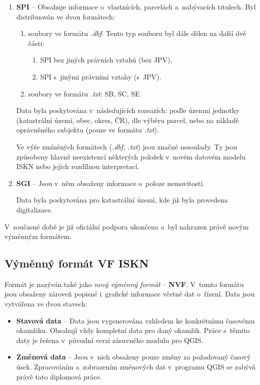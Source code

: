 \documentclass[a4paper,12pt,oneside]{book}
\begin{document}
\begin{enumerate}
 \item \textbf{SPI} -- Obsahuje informace o~vlastnících, parcelách a~nabývacích titulech. Byl distribuován ve dvou formátech:
 \begin{enumerate}
  \item soubory ve formátu \textit{.dbf}: Tento typ souboru byl dále dělen na další dvě části:
  
  \begin{enumerate}
   \item SPI bez jiných právních vztahů (bez JPV),
   \item SPI s~jinými právními vztahy (s~JPV).
  \end{enumerate}
  
  \item soubory ve formátu \textit{.txt}: SB, SC, SE
 \end{enumerate}
 
 Data byla poskytována v~následujících rozsazích: podle územní jednotky (katastrální území, obec, okres, ČR), dle výběru parcel, nebo na základě oprávněného subjektu (pouze ve formátu \textit{.txt}).
 
 Ve výše zmíněných formátech (\textit{.dbf, .txt}) jsou značné nesoulady. Ty jsou způsobeny hlavně neexistencí některých položek v~novém datovém modelu ISKN nebo jejich rozdílnou interpretací.

 \item \textbf{SGI} -- Jsou v~něm obsaženy informace o~poloze nemovitostí. 
 
 Data byla poskytována pro katastrální území, kde již byla provedena digitalizace.
\end{enumerate}

V~současné době je již oficiální podpora ukončena a~byl nahrazen právě novým výměnným formátem. \cite{svf_cuzk}

\subsection{Výměnný formát VF ISKN}

Formát je nazýván také jako \textit{nový výměnný formát} -- \textbf{NVF}. V~tomto formátu jsou obsaženy zároveň popisné i~grafické informace včetně dat o~řízení. Data jsou vytvářena ve dvou stavech:

\begin{itemize}
 \item \textbf{Stavová data} -- Data jsou vygenerována vzhledem ke konkrétnímu časovému okamžiku. Obsahují vždy kompletní data pro daný okamžik. Práce s~těmito daty je řešena v~původní verzi zásuvného modulu pro QGIS. 
 
 \item \textbf{Změnová data} -- Jsou v~nich obsaženy pouze změny za požadovaný časový úsek. Zpracováním a~zobrazením změnových dat v~programu QGIS se zabývá právě tato diplomová práce.
\end{itemize}
\end{document}
